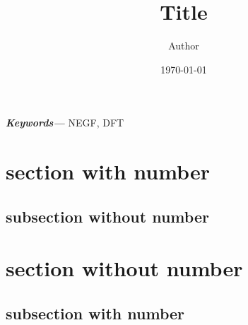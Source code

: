 \documentclass{article}
\title{Title}
\author{Author \orcidlink{0000-0000-0000-0000}}
\date{\today}
\providecommand{\keywords}[1]{\small\textbf{\textit{Keywords---}} #1}
\begin{document}
\maketitle

\begin{abstract}
    \lipsum[66]
\end{abstract}

\keywords{NEGF, DFT}

\tableofcontents


\section{section with number}

\lipsum[75]

\subsection*{subsection without number}

\lipsum[67]

\section{section without number}

\lipsum[23]

\subsection{subsection with number}

\lipsum[24]
\end{document}
